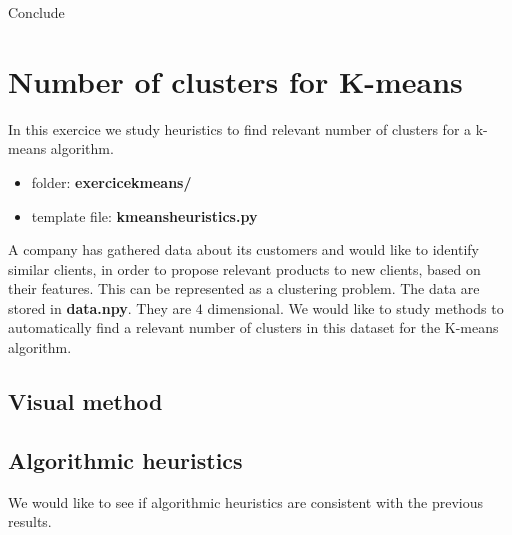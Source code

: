 \documentclass[
10pt, %
a4paper, %
oneside, %
headinclude,footinclude, %
BCOR5mm, %
]{scrartcl}
\begin{document}
\exercice{} Conclude

\section{\large\color{Blue}Number of clusters for K-means}

In this exercice we study heuristics to find relevant number of clusters for a k-means algorithm.

\begin{itemize}
    \item folder: \textbf{exercice\textunderscore k\textunderscore means/}
    \item template file: \textbf{k\textunderscore means\textunderscore heuristics.py}
\end{itemize}

A company has gathered data about its customers and would like to identify similar clients, in order to propose relevant products to new clients, based on their features. This can be represented as a clustering problem. The data are stored in \textbf{{data.npy}}. They are $4$ dimensional. We would like to study methods to automatically find a relevant number of
clusters in this dataset for the K-means algorithm.

\subsection{Visual method}

{\color{Purple}{Is there a direct, visual way to have an idea of a relevant
number of clusters for these $4$-dimensional data ?}}

\subsection{Algorithmic heuristics}

We would like to see if algorithmic heuristics are consistent with the previous
results.
\end{document}

